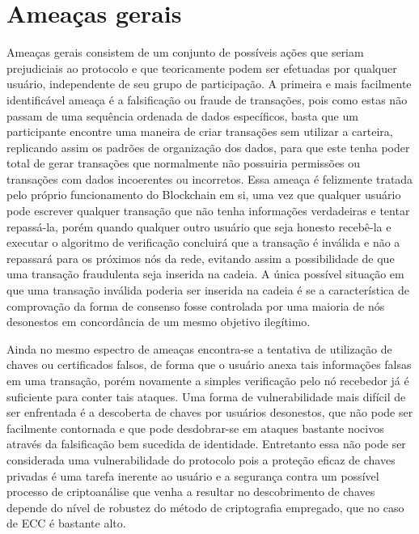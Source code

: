 \section{Ameaças gerais}
\label{sec:ameacas_gerai}

Ameaças gerais consistem de um conjunto de possíveis ações que seriam prejudiciais ao protocolo e que teoricamente podem ser efetuadas por qualquer usuário, independente de seu grupo de participação. A primeira e mais facilmente identificável ameaça é a falsificação ou fraude de transações, pois como estas não passam de uma sequência ordenada de dados específicos, basta que um participante encontre uma maneira de criar transações sem utilizar a carteira, replicando assim os padrões de organização dos dados, para que este tenha poder total de gerar transações que normalmente não possuiria permissões ou transações com dados incoerentes ou incorretos. Essa ameaça é felizmente tratada pelo próprio funcionamento do Blockchain em si, uma vez que qualquer usuário pode escrever qualquer transação que não tenha informações verdadeiras e tentar repassá-la, porém quando qualquer outro usuário que seja honesto recebê-la e executar o algoritmo de verificação 
concluirá que a transação é inválida e não a repassará para os próximos nós da rede, evitando assim a possibilidade de que uma transação fraudulenta seja inserida na cadeia. A única possível situação em que uma transação inválida poderia ser inserida na cadeia é se a característica de comprovação da forma de consenso fosse controlada por uma maioria de nós desonestos em concordância de um mesmo objetivo ilegítimo.

%
Ainda no mesmo espectro de ameaças encontra-se a tentativa de utilização de chaves ou certificados falsos, de forma que o usuário anexa tais informações falsas em uma transação, porém novamente a simples verificação pelo nó recebedor já é suficiente para conter tais ataques. Uma forma de vulnerabilidade mais difícil de ser enfrentada é a descoberta de chaves por usuários desonestos, que não pode ser facilmente contornada e que pode desdobrar-se em ataques bastante nocivos através da falsificação bem sucedida de identidade. Entretanto essa não pode ser considerada uma vulnerabilidade do protocolo pois a proteção eficaz de chaves privadas é uma tarefa inerente ao usuário e a segurança contra um possível processo de criptoanálise que venha a resultar no descobrimento de chaves depende do nível de robustez do método de criptografia empregado, que no caso de \ac{ECC} é bastante alto. 

